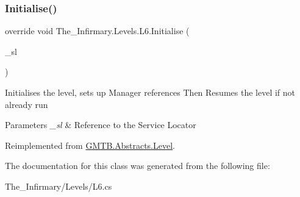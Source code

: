 \subsubsection{\texorpdfstring{Initialise()}{Initialise()}}
{\footnotesize\ttfamily override void The\+\_\+\+Infirmary.\+Levels.\+L6.\+Initialise (\begin{DoxyParamCaption}\item[{\mbox{\hyperlink{interface_g_m_t_b_1_1_interfaces_1_1_i_service_locator}{I\+Service\+Locator}}}]{\+\_\+sl }\end{DoxyParamCaption})\hspace{0.3cm}{\ttfamily [virtual]}}



Initialises the level, sets up Manager references Then Resumes the level if not already run 


\begin{DoxyParams}{Parameters}
{\em \+\_\+sl} & Reference to the Service Locator \\
\hline
\end{DoxyParams}


Reimplemented from \mbox{\hyperlink{class_g_m_t_b_1_1_abstracts_1_1_level_a0048401bb0fb66b0fb0c19b3b25e4265}{G\+M\+T\+B.\+Abstracts.\+Level}}.



The documentation for this class was generated from the following file\+:\begin{DoxyCompactItemize}
\item 
The\+\_\+\+Infirmary/\+Levels/L6.\+cs\end{DoxyCompactItemize}
